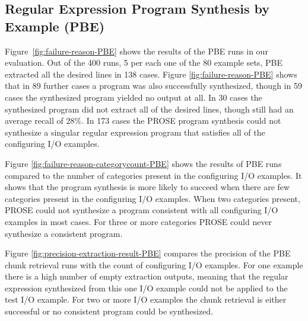 \documentclass[\myrootdir/main.tex]{subfiles}
\begin{document}
\subsection{Regular Expression Program Synthesis by Example (PBE)}
Figure~\ref{fig:failure-reason-PBE} shows the results of the PBE runs in our evaluation.
Out of the 400 runs, 5 per each one of the 80 example sets, PBE extracted all the desired lines in 138 cases.
Figure \ref{fig:failure-reason-PBE} shows that in 89 further cases a program was also successfully synthesized, though in 59 cases the synthesized program yielded no output at all.
In 30 cases the synthesized program did not extract all of the desired lines, though still had an average recall of 28\%.
In 173 cases the PROSE program synthesis could not synthesize a singular regular expression program that satisfies all of the configuring I/O examples.

Figure \ref{fig:failure-reason-categorycount-PBE} shows the results of PBE runs compared to the number of categories present in the configuring I/O examples.
It shows that the program synthesis is more likely to succeed when there are few categories present in the configuring I/O examples.
When two categories present, PROSE could not synthesize a program consistent with all configuring I/O examples in most cases.
For three or more categories PROSE could never synthesize a consistent program.

Figure \ref{fig:precision-extraction-result-PBE} compares the precision of the PBE chunk retrieval runs with the count of configuring I/O examples.
For one example there is a high number of empty extraction outputs, meaning that the regular expression synthesized from this one I/O example could not be applied to the test I/O example.
For two or more I/O examples the chunk retrieval is either successful or no consistent program could be synthesized.
\end{document}
